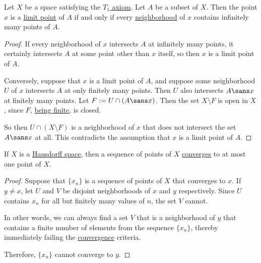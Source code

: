 Let $X$ be a space satisfying the \href{f294751}{$T_1$ axiom}. Let $A$ be a
subset of $X$. Then the point $x$ is a \href{b0219cd}{limit point} of $A$ if
and only if every \href{de512d5}{neighborhood} of $x$ contains infinitely many
points of $A$.

\begin{proof}
  If every neighborhood of $x$ intersects $A$ at infinitely many points, it
  certainly intersects $A$ at some point other than $x$ itself, so then $x$ is
  a limit point of $A$.

  Conversely, suppose that $x$ is a limit point of $A$, and suppose some
  neighborhood $U$ of $x$ intersects $A$ at only finitely many points. Then $U$
  also intersects $A\sans x$ at finitely many points. Let $F:=U\cap(A\sans x)$.
  Then the set $X\setminus F$ is open in $X$, since $F$, \href{f294751}{being
  finite}, is closed.

  So then $U\cap(X\setminus F)$ is a neighborhood of $x$ that does not
  intersect the set $A\sans x$ at all. This contradicts the assumption that $x$
  is a limit point of $A$.
\end{proof}

\label{ca2aef2}

If $X$ is a \href{e8a8d91}{Hausdorff space}, then a sequence of points of $X$
\href{c8f4bbb}{converges} to at most one point of $X$.

\begin{proof}
  Suppose that $\{x_n\}$ is a sequence of points of $X$ that converges to $x$.
  If $y\neq x$, let $U$ and $V$ be disjoint neighborhoods of $x$ and $y$
  respectively. Since $U$ contains $x_n$ for all but finitely many values of
  $n$, the set $V$ cannot.

  In other words, we can always find a set $V$ that is a neighborhood of $y$
  that contains a finite number of elements from the sequence $\{x_n\}$,
  thereby immediately failing the \href{c8f4bbb}{convergence} criteria.

  Therefore, $\{x_n\}$ cannot converge to $y$.
\end{proof}

